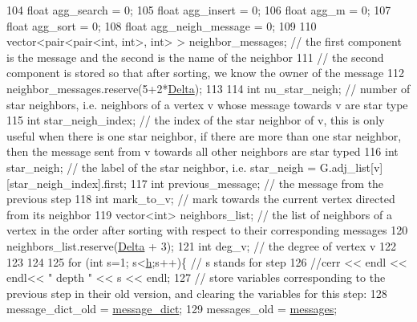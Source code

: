 \begin{DoxyCode}
104   \textcolor{keywordtype}{float} agg\_search = 0;
105   \textcolor{keywordtype}{float} agg\_insert = 0;
106   \textcolor{keywordtype}{float} agg\_m = 0;
107   \textcolor{keywordtype}{float} agg\_sort = 0;
108   \textcolor{keywordtype}{float} agg\_neigh\_message = 0;
109 
110   vector<pair<pair<int, int>, \textcolor{keywordtype}{int}> > neighbor\_messages; \textcolor{comment}{// the first component is the message and the
       second is the name of the neighbor}
111   \textcolor{comment}{// the second component is stored so that after sorting, we know the owner of the message}
112   neighbor\_messages.reserve(5+2*\hyperlink{classgraph__message_a45dfd061b7bc73572e5132fbf66efd55}{Delta});
113 
114   \textcolor{keywordtype}{int} nu\_star\_neigh; \textcolor{comment}{// number of star neighbors, i.e. neighbors of a vertex v whose message towards v are
       star type}
115   \textcolor{keywordtype}{int} star\_neigh\_index; \textcolor{comment}{// the index of the star neighbor of v, this is only useful when there is one star
       neighbor, if there are more than one star neighbor, then the message sent from v towards all other neighbors
       are star typed}
116   \textcolor{keywordtype}{int} star\_neigh; \textcolor{comment}{// the label of the star neighbor, i.e. star\_neigh =
       G.adj\_list[v][star\_neigh\_index].first;}
117   \textcolor{keywordtype}{int} previous\_message; \textcolor{comment}{// the message from the previous step}
118   \textcolor{keywordtype}{int} mark\_to\_v; \textcolor{comment}{// mark towards the current vertex directed from its neighbor}
119   vector<int> neighbors\_list; \textcolor{comment}{// the list of neighbors of a vertex in the order after sorting with respect
       to their corresponding messages}
120   neighbors\_list.reserve(\hyperlink{classgraph__message_a45dfd061b7bc73572e5132fbf66efd55}{Delta} + 3);
121   \textcolor{keywordtype}{int} deg\_v; \textcolor{comment}{// the degree of vertex v }
122 
123 
124 
125   \textcolor{keywordflow}{for} (\textcolor{keywordtype}{int} s=1; s<\hyperlink{classgraph__message_a934d63ed7275c211e13c6fb68824ed46}{h};s++)\{ \textcolor{comment}{// s stands for step}
126     \textcolor{comment}{//cerr << endl << endl<< " depth " << s << endl;}
127     \textcolor{comment}{// store variables corresponding to the previous step in their old version, and clearing the variables
       for this step:}
128     message\_dict\_old = \hyperlink{classgraph__message_a557473b726dc5d80618055a6b843670f}{message\_dict};
129     messages\_old = \hyperlink{classgraph__message_af680c8a1755cf8d4aba389c1a3d6634e}{messages};

\end{DoxyCode}
